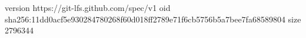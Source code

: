 version https://git-lfs.github.com/spec/v1
oid sha256:11dd0acf5e930284780268f60d018ff2789e71f6cb5756b5a7bee7fa68589804
size 2796344
